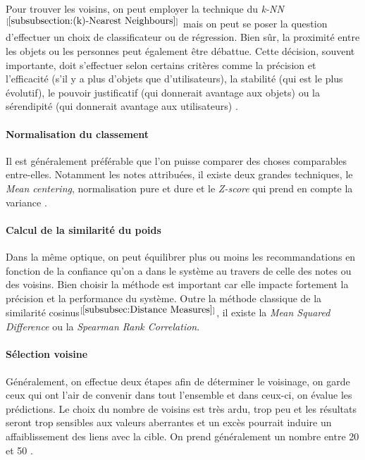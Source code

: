Pour trouver les voisins, on peut employer la technique du \textit{k-NN}$^{[\ref{subsubsection:(k)-Nearest Neighbours}]}$ mais on peut se poser la question d'effectuer un choix de classificateur ou de régression. Bien sûr, la proximité entre les objets ou les personnes peut également être débattue. Cette décision, souvent importante, doit s'effectuer selon certains critères comme la précision et l'efficacité (s'il y a plus d'objets que d'utilisateurs), la stabilité (qui est le plus évolutif), le pouvoir justificatif (qui donnerait avantage aux objets) ou la sérendipité (qui donnerait avantage aux utilisateurs) \cite{wang2006unifying}.

\paragraph{Normalisation du classement}

Il est généralement préférable que l'on puisse comparer des choses comparables entre-elles. Notamment les notes attribuées, il existe deux grandes techniques, le \textit{Mean centering}, normalisation pure et dure \cite{konstan1997grouplens} et le \textit{Z-score} qui prend en compte la variance \cite{breese1998empirical}.

\paragraph{Calcul de la similarité du poids}

Dans la même optique, on peut équilibrer plus ou moins les recommandations en fonction de la confiance qu'on a dans le système au travers de celle des notes ou des voisins. Bien choisir la méthode est important car elle impacte fortement la précision et la performance du système. Outre la méthode classique de la similarité cosinus$^{[\ref{subsubsec:Distance Measures}]}$, il existe la \textit{Mean Squared Difference} ou la \textit{Spearman Rank Correlation}\cite{iman1982distribution}.

\paragraph{Sélection voisine}

Généralement, on effectue deux étapes afin de déterminer le voisinage, on garde ceux qui ont l'air de convenir dans tout l'ensemble et dans ceux-ci, on évalue les prédictions. Le choix du nombre de voisins est très ardu, trop peu et les résultats seront trop sensibles aux valeurs aberrantes et un excès pourrait induire un affaiblissement des liens avec la cible. On prend généralement un nombre entre 20 et 50 \cite{breese1998empirical, good1999combining}.

